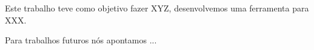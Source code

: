 \label{conclusao}

Este trabalho teve como objetivo fazer XYZ, desenvolvemos uma ferramenta para XXX.

Para trabalhos futuros nós apontamos ...